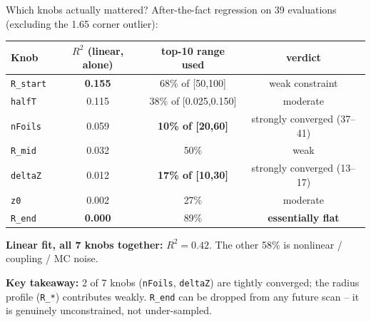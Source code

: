 \documentclass[10pt,aspectratio=169]{beamer}
\begin{document}
\begin{frame}{Which knobs actually mattered?}
After-the-fact regression on 39 evaluations (excluding the 1.65 corner outlier):

\medskip
\begin{tabular}{lccc}
\toprule
Knob & $R^2$ (linear, alone) & top-10 range used & verdict \\
\midrule
\texttt{R\_start}  & \textbf{0.155} & 68\% of [50,100] & weak constraint \\
\texttt{halfT}     & 0.115 & 38\% of [0.025,0.150] & moderate \\
\texttt{nFoils}    & 0.059 & \textbf{10\% of [20,60]} & strongly converged (37--41) \\
\texttt{R\_mid}    & 0.032 & 50\% & weak \\
\texttt{deltaZ}    & 0.012 & \textbf{17\% of [10,30]} & strongly converged (13--17) \\
\texttt{z0}        & 0.002 & 27\% & moderate \\
\texttt{R\_end}    & \textbf{0.000} & 89\% & \textbf{essentially flat} \\
\bottomrule
\end{tabular}

\medskip
\textbf{Linear fit, all 7 knobs together:} $R^2 = 0.42$.
The other 58\% is nonlinear / coupling / MC noise.

\smallskip
\textbf{Key takeaway:} 2 of 7 knobs (\texttt{nFoils}, \texttt{deltaZ}) are tightly
converged; the radius profile (\texttt{R\_*}) contributes weakly.
\texttt{R\_end} can be dropped from any future scan -- it is genuinely
unconstrained, not under-sampled.
\end{frame}
\end{document}
